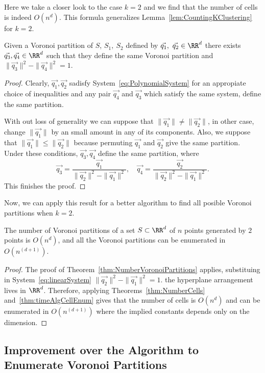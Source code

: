 Here we take a closer look to the case $k=2$ and we find that the number of cells
is indeed $O(n^{d})$. This formula generalizes Lemma~\ref{lem:CountingKClustering}
for $k=2$.
\begin{lemma}
  Given a Voronoi partition of $S$, $S_1,\ S_2$ defined by  
  $\vec{q_1},\ \vec{q_2}\in\RR^d$ there exists $\vec{q_3},\vec{q_4}\in\RR^d$ 
  such that they define the same Voronoi partition and  
  $\|\vec{q_3}\|^2-\|\vec{q_4}\|^2=1$.
\end{lemma}
\begin{proof}
  Clearly, $\vec{q_1},\vec{q_2}$ sadisfy System~\eqref{eq:PolynomialSystem} for an
  appropiate choice of inequalities and any pair $\vec{q_4}$ and $\vec{q_3}$ which 
  satisfy the same system, define the same partition. 

  With out loss of generality we can suppose that $\|\vec{q_1}\|\neq \|\vec{q_2}\|$,
  in other case, change $\|\vec{q_1}\|$ by an small amount in any of its components.
  Also, we suppose that $\|\vec{q_1}\|\le \|\vec{q_2}\|$ because permuting
  $\vec{q_1}$ and $\vec{q_2}$ give the same partition. Under these conditions,
  $\vec{q_3},\vec{q_4}$ define the same partition, where 
  \begin{equation*}
    \vec{q_3}=\frac{\vec{q_1}}{\|\vec{q_2}\|^2-\|\vec{q_1}\|^2},\quad     
    \vec{q_4}=\frac{\vec{q_2}}{\|\vec{q_2}\|^2-\|\vec{q_1}\|^2}.
  \end{equation*}
  This finishes the proof.
\end{proof}
Now, we can apply this result for a better algorithm to find all posible 
Voronoi partitions when $k=2.$
\begin{theorem}
  \label{lemma:NumberVoronoiPartitionsk2}
  The number of Voronoi partitions of a set $S\subset\RR^d$ of $n$ points 
  generated by $2$ points is $O(n^{d})$, and all the Voronoi partitions
  can be enumerated in $O(n^{(d+1)})$.
\end{theorem}
\begin{proof}
The proof of Theorem~\ref{thm:NumberVoronoiPartitions} applies, 
substituing in System~\eqref{eq:linearSystem} $\|\vec{q_2}\|^2-\|\vec{q_1}\|^2=1$.
the hyperplane arrangement lives in $\RR^{d}$. Therefore,  applying  
Theorems~\ref{thm:NumberCells} and~\ref{thm:timeAlgCellEnum} gives that the 
number of cells is $O(n^{d})$ and can be enumerated in $O(n^{(d+1)})$ where the implied
constants depends only on the dimension.
\end{proof}

\subsection{ Improvement over the Algorithm to 
  Enumerate Voronoi Partitions}

